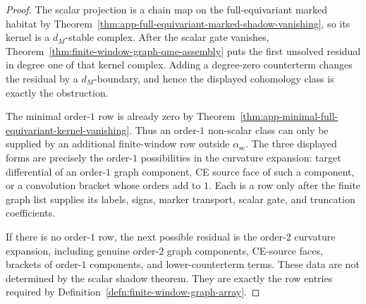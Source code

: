 \begin{proof}
  The scalar projection is a chain map on the full-equivariant marked
  habitat by Theorem~\ref{thm:app-full-equivariant-marked-shadow-vanishing},
  so its kernel is a \(d_M\)-stable complex.  After the scalar gate
  vanishes, Theorem~\ref{thm:finite-window-graph-qme-assembly} puts the
  first unsolved residual in degree one of that kernel complex.  Adding a
  degree-zero counterterm changes the residual by a \(d_M\)-boundary, and
  hence the displayed cohomology class is exactly the obstruction.

  The minimal order-\(1\) row is already zero by
  Theorem~\ref{thm:app-minimal-full-equivariant-kernel-vanishing}.  Thus an
  order-\(1\) non-scalar class can only be supplied by an additional
  finite-window row outside \(\alpha_{\mathrm{sc}}\).  The three displayed
  forms are precisely the order-\(1\) possibilities in the curvature
  expansion: target differential of an order-\(1\) graph component, CE
  source face of such a component, or a convolution bracket whose orders
  add to \(1\).  Each is a row only after the finite graph list supplies
  its labels, signs, marker transport, scalar gate, and truncation
  coefficients.

  If there is no order-\(1\) row, the next possible residual is the
  order-\(2\) curvature expansion, including genuine order-\(2\) graph
  components, CE-source faces, brackets of order-\(1\) components, and
  lower-counterterm terms.  These data are not determined by the scalar
  shadow theorem.  They are exactly the row entries required by
  Definition~\ref{defn:finite-window-graph-array}.
\end{proof}

